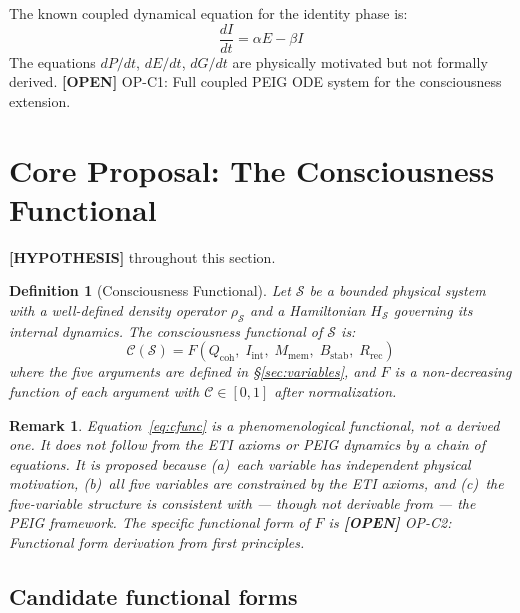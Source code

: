 \documentclass[12pt,letterpaper]{article}
\newtheorem{definition}{Definition}[section]
\newtheorem{remark}{Remark}[section]
\newcommand{\HYPOTHESIS}[1]{\textcolor{blue!70!black}{\textbf{[HYPOTHESIS]}} #1}
\newcommand{\OPEN}[1]{\textcolor{red!70!black}{\textbf{[OPEN]}} #1}
\newcommand{\Cfunc}{\mathcal{C}}
\newcommand{\Qcoh}{Q_{\mathrm{coh}}}
\newcommand{\Iint}{I_{\mathrm{int}}}
\newcommand{\Mmem}{M_{\mathrm{mem}}}
\newcommand{\Bstab}{B_{\mathrm{stab}}}
\newcommand{\Rrec}{R_{\mathrm{rec}}}
\begin{document}
The known coupled dynamical equation for the identity phase is:
\begin{equation}
  \frac{dI}{dt} = \alpha E - \beta I
  \label{eq:peig_identity}
\end{equation}
The equations $dP/dt$, $dE/dt$, $dG/dt$ are physically motivated but not
formally derived. \OPEN{OP-C1: Full coupled PEIG ODE system for the
consciousness extension.}

\section{Core Proposal: The Consciousness Functional}
\label{sec:functional}

\HYPOTHESIS{} throughout this section.

\begin{definition}[Consciousness Functional]
\label{def:cfunc}
Let $\mathcal{S}$ be a bounded physical system with a well-defined density
operator $\rho_\mathcal{S}$ and a Hamiltonian $H_\mathcal{S}$ governing its
internal dynamics. The \emph{consciousness functional} of $\mathcal{S}$ is:
\begin{equation}
  \boxed{
    \Cfunc(\mathcal{S}) = F\!\left(\Qcoh,\;\Iint,\;\Mmem,\;\Bstab,\;\Rrec\right)
  }
  \label{eq:cfunc}
\end{equation}
where the five arguments are defined in \S\ref{sec:variables}, and $F$ is a
non-decreasing function of each argument with $\Cfunc \in [0,1]$ after
normalization.
\end{definition}

\begin{remark}
Equation~\eqref{eq:cfunc} is a \emph{phenomenological} functional, not a
derived one. It does not follow from the ETI axioms or PEIG dynamics by a
chain of equations. It is proposed because (a)~each variable has independent
physical motivation, (b)~all five variables are constrained by the ETI axioms,
and (c)~the five-variable structure is consistent with --- though not derivable
from --- the PEIG framework. The specific functional form of $F$ is
\OPEN{OP-C2: Functional form derivation from first principles.}
\end{remark}

\subsection{Candidate functional forms}
\label{sec:functional_forms}
\end{document}
